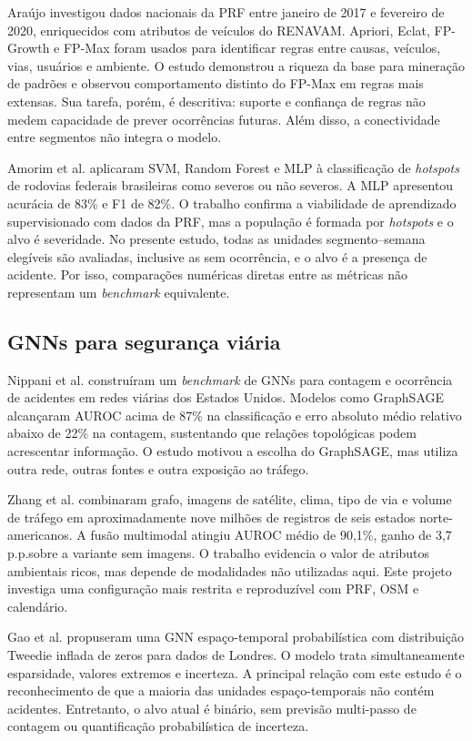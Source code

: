 \documentclass[12pt]{article}
\newcommand{\pp}{\,p.p.}
\begin{document}
Araújo \cite{araujo2022} investigou dados nacionais da PRF entre
janeiro de 2017 e fevereiro de 2020, enriquecidos com atributos de
veículos do RENAVAM. Apriori, Eclat, FP-Growth e FP-Max foram usados
para identificar regras entre causas, veículos, vias, usuários e
ambiente. O estudo demonstrou a riqueza da base para mineração de
padrões e observou comportamento distinto do FP-Max em regras mais
extensas. Sua tarefa, porém, é descritiva: suporte e confiança de
regras não medem capacidade de prever ocorrências futuras. Além disso,
a conectividade entre segmentos não integra o modelo.

Amorim et al. \cite{amorim2023} aplicaram SVM, Random Forest e MLP à
classificação de \textit{hotspots} de rodovias federais brasileiras
como severos ou não severos. A MLP apresentou acurácia de 83\% e F1 de
82\%. O trabalho confirma a viabilidade de aprendizado supervisionado
com dados da PRF, mas a população é formada por \textit{hotspots} e o
alvo é severidade. No presente estudo, todas as unidades
segmento--semana elegíveis são avaliadas, inclusive as sem ocorrência,
e o alvo é a presença de acidente. Por isso, comparações numéricas
diretas entre as métricas não representam um \textit{benchmark}
equivalente.

\subsection{GNNs para segurança viária}

Nippani et al. \cite{nippani2023} construíram um \textit{benchmark} de
GNNs para contagem e ocorrência de acidentes em redes viárias dos
Estados Unidos. Modelos como GraphSAGE alcançaram AUROC acima de 87\%
na classificação e erro absoluto médio relativo abaixo de 22\% na
contagem, sustentando que relações topológicas podem acrescentar
informação. O estudo motivou a escolha do GraphSAGE, mas utiliza outra
rede, outras fontes e outra exposição ao tráfego.

Zhang et al. \cite{zhang2026} combinaram grafo, imagens de satélite,
clima, tipo de via e volume de tráfego em aproximadamente nove milhões
de registros de seis estados norte-americanos. A fusão multimodal
atingiu AUROC médio de 90,1\%, ganho de 3,7\pp sobre a variante sem
imagens. O trabalho evidencia o valor de atributos ambientais ricos,
mas depende de modalidades não utilizadas aqui. Este projeto investiga
uma configuração mais restrita e reproduzível com PRF, OSM e
calendário.

Gao et al. \cite{zhuang2024} propuseram uma GNN espaço-temporal
probabilística com distribuição Tweedie inflada de zeros para dados de
Londres. O modelo trata simultaneamente esparsidade, valores extremos e
incerteza. A principal relação com este estudo é o reconhecimento de
que a maioria das unidades espaço-temporais não contém acidentes.
Entretanto, o alvo atual é binário, sem previsão multi-passo de
contagem ou quantificação probabilística de incerteza.
\end{document}
